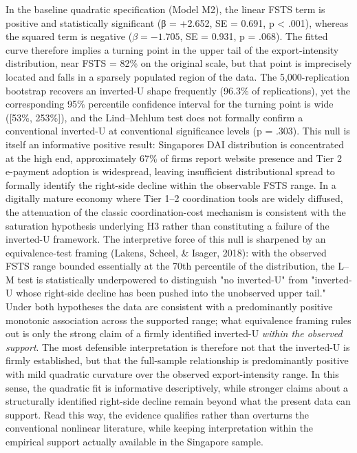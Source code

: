 \documentclass[12pt,a4paper]{article}
\begin{document}
In the baseline quadratic specification (Model M2), the linear FSTS term
is positive and statistically significant (β = +2.652, SE = 0.691, p
\textless{} .001), whereas the squared term is negative
(\(\beta = −1.705\), SE = 0.931, p = .068). The fitted curve therefore
implies a turning point in the upper tail of the export-intensity
distribution, near FSTS = 82\% on the original scale, but that point is
imprecisely located and falls in a sparsely populated region of the
data. The 5,000-replication bootstrap recovers an inverted-U shape
frequently (96.3\% of replications), yet the corresponding 95\%
percentile confidence interval for the turning point is wide ({[}53\%,
253\%{]}), and the Lind--Mehlum test does not formally confirm a
conventional inverted-U at conventional significance levels (p = .303).
This null is itself an informative positive result:
Singapore\textquotesingle s DAI distribution is concentrated at the high
end, approximately 67\% of firms report website presence and Tier 2
e-payment adoption is widespread, leaving insufficient distributional
spread to formally identify the right-side decline within the observable
FSTS range. In a digitally mature economy where Tier 1--2 coordination
tools are widely diffused, the attenuation of the classic
coordination-cost mechanism is consistent with the saturation hypothesis
underlying H3 rather than constituting a failure of the inverted-U
framework. The interpretive force of this null is sharpened by an
equivalence-test framing (Lakens, Scheel, \& Isager, 2018): with the
observed FSTS range bounded essentially at the 70th percentile of the
distribution, the L--M test is statistically underpowered to distinguish
"no inverted-U" from "inverted-U whose right-side decline has been
pushed into the unobserved upper tail." Under both hypotheses the data
are consistent with a predominantly positive monotonic association
across the supported range; what equivalence framing rules out is only
the strong claim of a firmly identified inverted-U \emph{within the
observed support}. The most defensible interpretation is therefore not
that the inverted-U is firmly established, but that the full-sample
relationship is predominantly positive with mild quadratic curvature
over the observed export-intensity range. In this sense, the quadratic
fit is informative descriptively, while stronger claims about a
structurally identified right-side decline remain beyond what the
present data can support. Read this way, the evidence qualifies rather
than overturns the conventional nonlinear literature, while keeping
interpretation within the empirical support actually available in the
Singapore sample.
\end{document}
